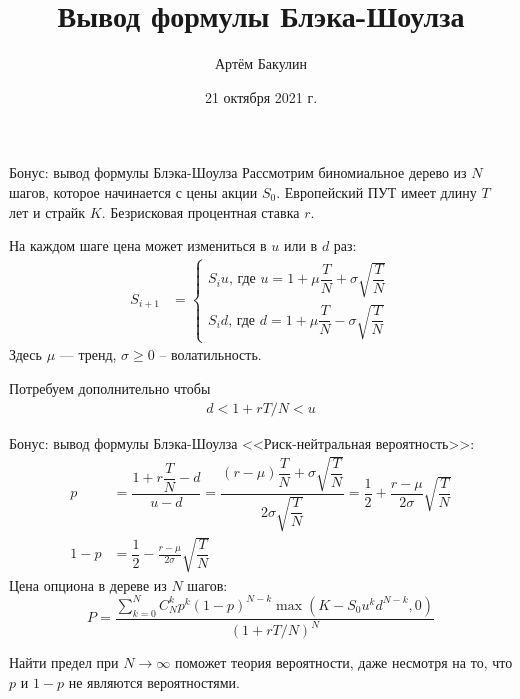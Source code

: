 \documentclass[pdf,12pt]{beamer}
\title{Вывод формулы Блэка-Шоулза}
\author{Артём Бакулин}
\date{21 октября 2021 г.}
\begin{document}
\begin{frame}
\titlepage
\end{frame}

\begin{frame}{Бонус: вывод формулы Блэка-Шоулза}
\justify
Рассмотрим биномиальное дерево из $N$ шагов, которое начинается с цены акции $S_0$. Европейский ПУТ имеет длину $T$ лет и страйк $K$. Безрисковая процентная ставка $r$.

\vspace{\baselineskip}
На каждом шаге цена может измениться в $u$ или в $d$ раз:
\begin{align*}
S_{i+1} &= \begin{cases}
S_iu\text{, где } u = 1 + \mu \dfrac{T}{N} + \sigma\sqrt{\dfrac{T}{N}} \\
S_id\text{, где } d = 1 + \mu \dfrac{T}{N} - \sigma\sqrt{\dfrac{T}{N}}\end{cases}
\end{align*}
Здесь $\mu$ --- тренд, $\sigma \ge 0$ -- волатильность.
\vspace{\baselineskip}

Потребуем дополнительно чтобы
\begin{align*}
d < 1+rT/N < u
\end{align*}
\end{frame}

\begin{frame}{Бонус: вывод формулы Блэка-Шоулза}
<<Риск-нейтральная вероятность>>:
\begin{align*}
p &= \dfrac{1+r\dfrac{T}{N} - d}{u - d} = \dfrac{\left(r-\mu\right)\dfrac{T}{N} + \sigma\sqrt{\dfrac{T}{N}}}{2\sigma\sqrt{\dfrac{T}{N}}} 
= \dfrac{1}{2} + \dfrac{r -\mu}{2\sigma}\sqrt{\dfrac{T}{N}} \\
1-p &= \dfrac{1}{2} - \frac{r -\mu}{2\sigma}\sqrt{\dfrac{T}{N}}
\end{align*}
Цена опциона в дереве из $N$ шагов:
\begin{equation*}
P = \dfrac{\sum\limits_{k=0}^{N} C^k_Np^k(1-p)^{N-k}\max(K - S_0u^kd^{N-k},0)}{\left(1+rT/N \right)^N}
\end{equation*}

\justify
Найти предел при $N \to \infty$ поможет теория вероятности, даже несмотря на то, что $p$ и $1-p$ не являются вероятностями.
\end{frame}
\end{document}
